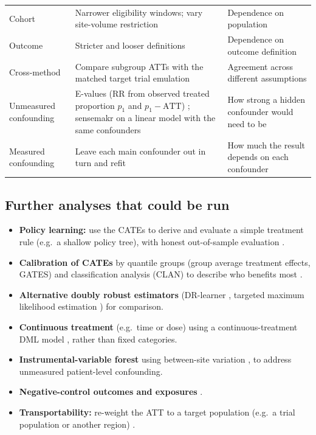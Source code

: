 \begin{xltabular}{\textwidth}{L{2.6cm}YY}
Cohort & Narrower eligibility windows; vary site-volume restriction & Dependence on population \\
Outcome & Stricter and looser definitions & Dependence on outcome definition \\
Cross-method & Compare subgroup ATTs with the matched target trial emulation & Agreement across different assumptions \\
Unmeasured confounding & E-values (RR from observed treated proportion $p_1$ and $p_1 - \mathrm{ATT}$) \cite{vanderweele2017evalue}; sensemakr \cite{cinelli2020} on a linear model with the same confounders & How strong a hidden confounder would need to be \\
Measured confounding & Leave each main confounder out in turn and refit & How much the result depends on each confounder \\
\bottomrule
\end{xltabular}

\subsection{Further analyses that could be run}

\begin{itemize}
\item \textbf{Policy learning:} use the CATEs to derive and evaluate a simple treatment rule (e.g.\ a shallow policy tree), with honest out-of-sample evaluation \cite{athey2021}.
\item \textbf{Calibration of CATEs} by quantile groups (group average treatment effects, GATES) and classification analysis (CLAN) to describe who benefits most \cite{chernozhukov2025}.
\item \textbf{Alternative doubly robust estimators} (DR-learner \cite{kennedy2023}, targeted maximum likelihood estimation \cite{vanderlaan2006}) for comparison.
\item \textbf{Continuous treatment} (e.g.\ time or dose) using a continuous-treatment DML model \cite{chernozhukov2018}, rather than fixed categories.
\item \textbf{Instrumental-variable forest} using between-site variation \cite{athey2019,baiocchi2014}, to address unmeasured patient-level confounding.
\item \textbf{Negative-control outcomes and exposures} \cite{lipsitch2010}.
\item \textbf{Transportability:} re-weight the ATT to a target population (e.g.\ a trial population or another region) \cite{dahabreh2019}.
\end{itemize}
